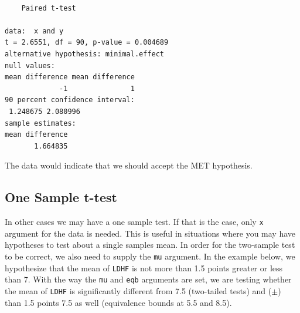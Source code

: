 \documentclass[
]{interact}
\newenvironment{Shaded}{\begin{snugshade}}{\end{snugshade}}
\newcommand{\AttributeTok}[1]{\textcolor[rgb]{0.40,0.45,0.13}{#1}}
\newcommand{\ConstantTok}[1]{\textcolor[rgb]{0.56,0.35,0.01}{#1}}
\newcommand{\DecValTok}[1]{\textcolor[rgb]{0.68,0.00,0.00}{#1}}
\newcommand{\FloatTok}[1]{\textcolor[rgb]{0.68,0.00,0.00}{#1}}
\newcommand{\FunctionTok}[1]{\textcolor[rgb]{0.28,0.35,0.67}{#1}}
\newcommand{\NormalTok}[1]{\textcolor[rgb]{0.00,0.23,0.31}{#1}}
\newcommand{\OtherTok}[1]{\textcolor[rgb]{0.00,0.23,0.31}{#1}}
\newcommand{\SpecialCharTok}[1]{\textcolor[rgb]{0.37,0.37,0.37}{#1}}
\newcommand{\StringTok}[1]{\textcolor[rgb]{0.13,0.47,0.30}{#1}}
\begin{document}
\begin{Shaded}
\end{Shaded}

\begin{verbatim}

    Paired t-test

data:  x and y
t = 2.6551, df = 90, p-value = 0.004689
alternative hypothesis: minimal.effect
null values:
mean difference mean difference 
             -1               1 
90 percent confidence interval:
 1.248675 2.080996
sample estimates:
mean difference 
       1.664835 
\end{verbatim}

The data would indicate that we should accept the MET hypothesis.

\newpage

\hypertarget{one-sample-t-test}{%
\subsection{One Sample t-test}\label{one-sample-t-test}}

In other cases we may have a one sample test. If that is the case, only
\texttt{x} argument for the data is needed. This is useful in situations
where you may have hypotheses to test about a single samples mean. In
order for the two-sample test to be correct, we also need to supply the
\texttt{mu} argument. In the example below, we hypothesize that the mean
of \texttt{LDHF} is not more than 1.5 points greater or less than 7.
With the way the \texttt{mu} and \texttt{eqb} arguments are set, we are
testing whether the mean of \texttt{LDHF} is significantly different
from 7.5 (two-tailed tests) and (\(\pm\)) than 1.5 points 7.5 as well
(equivalence bounds at 5.5 and 8.5).

\begin{Shaded}
\end{Shaded}
\end{document}
